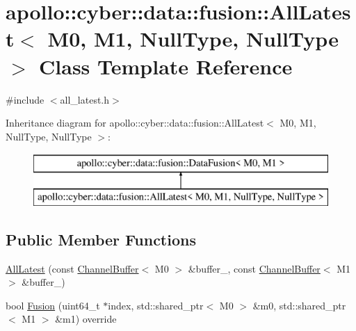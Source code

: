 \hypertarget{classapollo_1_1cyber_1_1data_1_1fusion_1_1AllLatest_3_01M0_00_01M1_00_01NullType_00_01NullType_01_4}{\section{apollo\-:\-:cyber\-:\-:data\-:\-:fusion\-:\-:All\-Latest$<$ M0, M1, Null\-Type, Null\-Type $>$ Class Template Reference}
\label{classapollo_1_1cyber_1_1data_1_1fusion_1_1AllLatest_3_01M0_00_01M1_00_01NullType_00_01NullType_01_4}
}


{\ttfamily \#include $<$all\-\_\-latest.\-h$>$}

Inheritance diagram for apollo\-:\-:cyber\-:\-:data\-:\-:fusion\-:\-:All\-Latest$<$ M0, M1, Null\-Type, Null\-Type $>$\-:\begin{figure}[H]
\begin{center}
\leavevmode
\includegraphics[height=2.000000cm]{classapollo_1_1cyber_1_1data_1_1fusion_1_1AllLatest_3_01M0_00_01M1_00_01NullType_00_01NullType_01_4}
\end{center}
\end{figure}
\subsection*{Public Member Functions}
\begin{DoxyCompactItemize}
\item 
\hyperlink{classapollo_1_1cyber_1_1data_1_1fusion_1_1AllLatest_3_01M0_00_01M1_00_01NullType_00_01NullType_01_4_aef6c11535619fac4e9adf9944ef98f60}{All\-Latest} (const \hyperlink{classapollo_1_1cyber_1_1data_1_1ChannelBuffer}{Channel\-Buffer}$<$ M0 $>$ \&buffer\-\_, const \hyperlink{classapollo_1_1cyber_1_1data_1_1ChannelBuffer}{Channel\-Buffer}$<$ M1 $>$ \&buffer\-\_)
\item 
bool \hyperlink{classapollo_1_1cyber_1_1data_1_1fusion_1_1AllLatest_3_01M0_00_01M1_00_01NullType_00_01NullType_01_4_a4b33c327a6f5e962f2a523bbd6825e6c}{Fusion} (uint64\-\_\-t $\ast$index, std\-::shared\-\_\-ptr$<$ M0 $>$ \&m0, std\-::shared\-\_\-ptr$<$ M1 $>$ \&m1) override
\end{DoxyCompactItemize}
